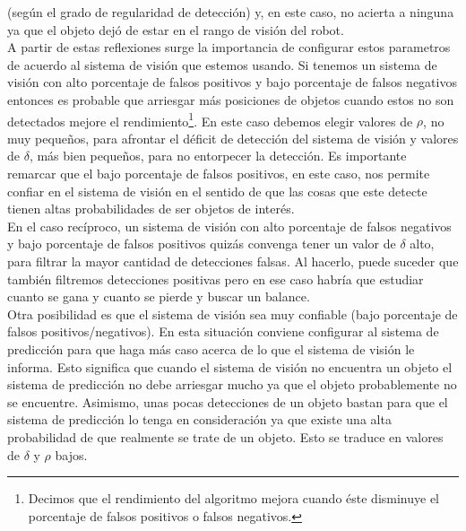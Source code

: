 (seg\'un el grado de regularidad de detecci\'on) y, en este caso, no 
acierta a ninguna ya que el objeto dej\'o de estar en el rango de visi\'on del 
robot.\\ 
\indent A partir de estas reflexiones surge la importancia de configurar 
estos parametros de acuerdo al sistema de visi\'on que estemos 
usando. Si tenemos un sistema de visi\'on con alto porcentaje de 
falsos positivos y bajo porcentaje de falsos negativos entonces es 
probable que arriesgar m\'as posiciones de objetos cuando estos no 
son detectados mejore el rendimiento\footnote{ Decimos que el 
rendimiento del algoritmo mejora cuando \'este disminuye el 
porcentaje de falsos positivos o falsos negativos.}. En este caso debemos elegir 
valores de $\rho$, no muy peque\~nos, para afrontar el d\'eficit de 
detecci\'on del sistema de visi\'on y valores de $\delta$, m\'as bien 
peque\~nos, para no entorpecer la detecci\'on. Es importante remarcar 
que el bajo porcentaje de falsos positivos, en este caso, nos 
permite confiar en el sistema de visi\'on en el sentido de que las cosas que 
este detecte tienen altas probabilidades de ser objetos de inter\'es. \\
\indent En el caso rec\'iproco, un sistema de visi\'on con alto 
porcentaje de falsos negativos y bajo porcentaje de falsos 
positivos quiz\'as convenga tener un valor de $\delta$ alto, para 
filtrar la mayor cantidad de detecciones falsas. Al hacerlo, puede 
suceder que tambi\'en filtremos detecciones positivas pero en ese 
caso habr\'ia que estudiar cuanto se gana y cuanto se pierde y 
buscar un balance.\\
\indent Otra posibilidad es que el sistema de visi\'on sea muy 
confiable (bajo porcentaje de falsos positivos/negativos). En 
esta situaci\'on conviene configurar al sistema de predicci\'on para 
que haga m\'as caso acerca de lo que el sistema de visi\'on le informa. Esto 
significa que cuando el sistema de visi\'on no encuentra un objeto 
el sistema de predicci\'on no debe arriesgar mucho ya que el objeto 
probablemente no se encuentre. Asimismo, unas pocas detecciones de 
un objeto bastan para que el sistema de predicci\'on lo tenga 
en consideraci\'on ya que existe una alta probabilidad de que 
realmente se trate de un objeto. Esto se traduce en valores de 
$\delta$ y $\rho$ bajos.
 


